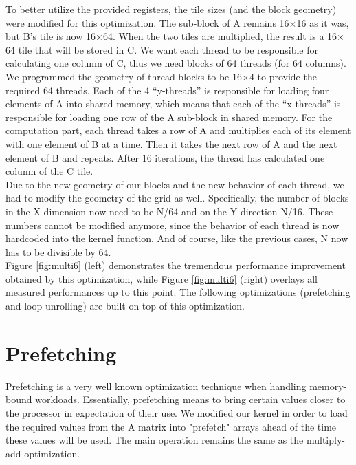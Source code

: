 \documentclass[paper=a4, fontsize=11pt]{scrartcl} %
\numberwithin{equation}{section} %
\numberwithin{figure}{section} %
\numberwithin{table}{section} %
\begin{document}
To better utilize the provided registers, the tile sizes (and the block geometry) were modified for this optimization. The sub-block of A remains 16$\times$16 as it was, but B's tile is now 16$\times$64. When the two tiles are multiplied, the result is a 16$\times$64 tile that will be stored in C. We want each thread to be responsible for calculating one column of C, thus we need blocks of 64 threads (for 64 columns).\\

We programmed the geometry of thread blocks to be 16$\times$4 to provide the required 64 threads. Each of the 4 ``y-threads'' is responsible for loading four elements of A into shared memory, which means that each of the ``x-threads'' is responsible for loading one row of the A sub-block in shared memory. For the computation part, each thread takes a row of A and multiplies each of its element with one element of B at a time. Then it takes the next row of A and the next element of B and repeats. After 16 iterations, the thread has calculated one column of the C tile.\\

Due to the new geometry of our blocks and the new behavior of each thread, we had to modify the geometry of the grid as well. Specifically, the number of blocks in the X-dimension now need to be N/64 and on the Y-direction N/16. These numbers cannot be modified anymore, since the behavior of each thread is now hardcoded into the kernel function. And of course, like the previous cases, N now has to be divisible by 64.\\

Figure \ref{fig:multi6} (left) demonstrates the tremendous performance improvement obtained by this optimization, while Figure \ref{fig:multi6} (right) overlays all measured performances up to this point. The following optimizations (prefetching and loop-unrolling) are built on top of this optimization.

\section {\textbf{Prefetching}}
Prefetching is a very well known optimization technique when handling memory-bound workloads. Essentially, prefetching means to bring certain values closer to the processor in expectation of their use. We modified our kernel in order to load the required values from the A matrix into "prefetch" arrays ahead of the time these values will be used. The main operation remains the same as the multiply-add optimization.\\
\end{document}

